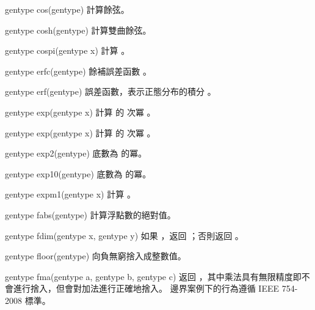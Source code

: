 gentype cos(gentype)
\stopbuffer
{}
計算餘弦。
\stopbuffer

gentype cosh(gentype)
\stopbuffer
{}
計算雙曲餘弦。
\stopbuffer

gentype cospi(gentype x)
\stopbuffer
{}
計算 。
\stopbuffer

gentype erfc(gentype)
\stopbuffer
{}
餘補誤差函數
 。
\stopbuffer

gentype erf(gentype)
\stopbuffer
{}
誤差函數，表示正態分布的積分
 。
\stopbuffer

gentype exp(gentype x)
\stopbuffer
{}
計算  的  次冪 。
\stopbuffer

gentype exp(gentype x)
\stopbuffer
{}
計算  的  次冪 。
\stopbuffer

gentype exp2(gentype)
\stopbuffer
{}
底數為  的冪。
\stopbuffer

gentype exp10(gentype)
\stopbuffer
{}
底數為  的冪。
\stopbuffer

gentype expm1(gentype x)
\stopbuffer
{}
計算 。
\stopbuffer

gentype fabs(gentype)
\stopbuffer
{}
計算浮點數的絕對值。
\stopbuffer

gentype fdim(gentype x,
	     gentype y)
\stopbuffer
{}
如果 ，返回 ；否則返回 。
\stopbuffer

gentype floor(gentype)
\stopbuffer
{}
向負無窮捨入成整數值。
\stopbuffer

gentype fma(gentype a,
	    gentype b,
	    gentype c)
\stopbuffer
{}
返回 ，其中乘法具有無限精度即不會進行捨入，但會對加法進行正確地捨入。
邊界案例下的行為遵循 IEEE 754-2008 標準。
\stopbuffer

